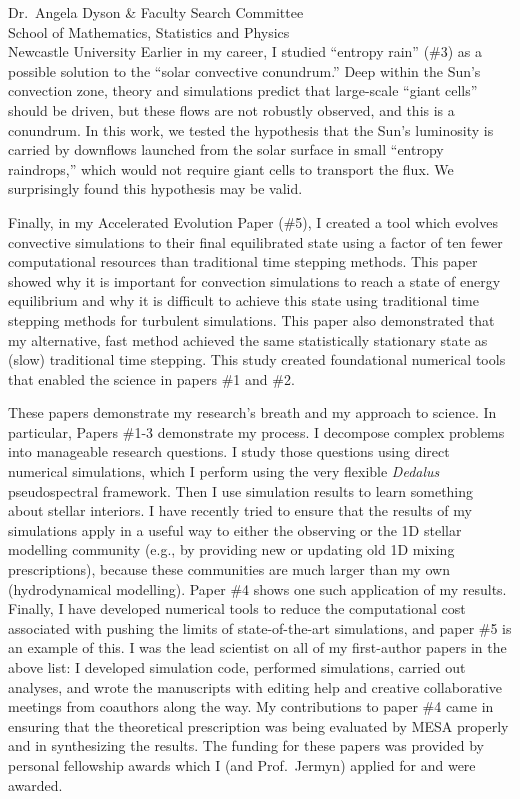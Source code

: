 \documentclass[12pt]{letter}
\begin{document}
\begin{letter}{
        Dr.~Angela Dyson \& Faculty Search Committee \\
        School of Mathematics, Statistics and Physics \\
        Newcastle University}
    Earlier in my career, I studied “entropy rain” (\#3) as a possible solution to the “solar convective conundrum.” Deep within the Sun’s convection zone, theory and simulations predict that large-scale “giant cells” should be driven, but these flows are not robustly observed, and this is a conundrum. 
    In this work, we tested the hypothesis that the Sun’s luminosity is carried by downflows launched from the solar surface in small “entropy raindrops,” which would not require giant cells to transport the flux. 
    We surprisingly found this hypothesis may be valid.

    Finally, in my Accelerated Evolution Paper (\#5), I created a tool which evolves convective simulations to their final equilibrated state using a factor of ten fewer computational resources than traditional time stepping methods. 
    This paper showed why it is important for convection simulations to reach a state of energy equilibrium and why it is difficult to achieve this state using traditional time stepping methods for turbulent simulations. 
    This paper also demonstrated that my alternative, fast method achieved the same statistically stationary state as (slow) traditional time stepping. 
    This study created foundational numerical tools that enabled the science in papers \#1 and \#2.

    These papers demonstrate my research's breath and my approach to science.
    In particular, Papers \#1-3 demonstrate my process. 
    I decompose complex problems into manageable research questions.
    I study those questions using direct numerical simulations, which I perform using the very flexible \emph{Dedalus} pseudospectral framework. 
    Then I use simulation results to learn something about stellar interiors. 
    I have recently tried to ensure that the results of my simulations apply in a useful way to either the observing or the 1D stellar modelling community (e.g., by providing new or updating old 1D mixing prescriptions), because these communities are much larger than my own (hydrodynamical modelling). 
    Paper \#4 shows one such application of my results. 
    Finally, I have developed numerical tools to reduce the computational cost associated with pushing the limits of state-of-the-art simulations, and paper \#5 is an example of this.
    I was the lead scientist on all of my first-author papers in the above list: I developed simulation code, performed simulations, carried out analyses, and wrote the manuscripts with editing help and creative collaborative meetings from coauthors along the way.
    My contributions to paper \#4 came in ensuring that the theoretical prescription was being evaluated by MESA properly and in synthesizing the results.
    The funding for these papers was provided by personal fellowship awards which I (and Prof.~Jermyn) applied for and were awarded.



\end{letter}
\end{document}
